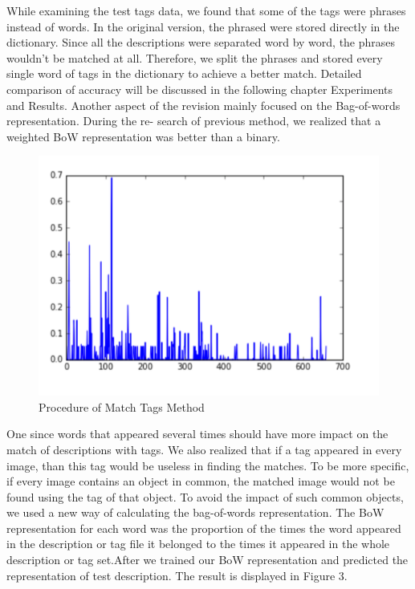 \documentclass{article}
\begin{document}
While examining the test tags data, we found that some of the tags were phrases instead of words. In the original version, the phrased were stored directly in the dictionary. Since all the descriptions were separated word by word, the phrases wouldn’t be matched at all. Therefore, we split the phrases and stored every single word of tags in the dictionary to achieve a better match. Detailed comparison of accuracy will be discussed in the following chapter Experiments and Results. 
Another aspect of the revision mainly focused on the Bag-of-words representation. During the re- search of previous method, we realized that a weighted BoW representation was better than a binary.

\begin{figure}[h]
  \centering
  \includegraphics[width=\textwidth]{2}
  \caption{Procedure of Match Tags Method}
\end{figure}
One since words that appeared several times should have more impact on the match of descriptions with tags. We also realized that if a tag appeared in every image, than this tag would be useless in finding the matches. To be more specific, if every image contains an object in common, the matched image would not be found using the tag of that object. To avoid the impact of such common objects, we used a new way of calculating the bag-of-words representation. The BoW representation for each word was the proportion of the times the word appeared in the description or tag file it belonged to the times it appeared in the whole description or tag set.After we trained our BoW representation and predicted the representation of test description. The result is displayed in Figure 3. 
\end{document}
